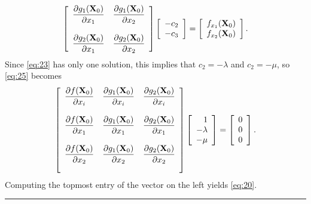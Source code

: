\documentclass{article}
\newcommand{\bbox}{\phantom{1}\hfill{\rule{6pt}{6pt}}}
\newcommand{\dst}{\displaystyle}
\begin{document}
$$
\left[\begin{array}{ccccccc}
\dst{\frac{{\partial g_{1}({\bf X}_{0})}}{{\partial  x_{1}}}}&
\dst{\frac{{\partial g_{1}({\bf X}_{0})}}{{\partial  x_{2}}}}\\\\
\dst{\frac{{\partial g_{2}({\bf X}_{0})}}{{\partial  x_{1}}}}&
\dst{\frac{{\partial g_{2}({\bf X}_{0})}}{{\partial  x_{2}}}}\\
\end{array}\right]
\left[\begin{array}{ccccccc}
-c_{2}\\-c_{3}
\end{array}\right]=
\left[\begin{array}{ccccccc}
f_{x_{1}}({\bf X}_{0})\\f_{x_{2}}({\bf X}_{0})\\
\end{array}\right].
$$
Since  \eqref{eq:23}  has only one solution,
 this implies that
$c_{2}=-\lambda$ and $c_{2}=-\mu$, so \eqref{eq:25}   becomes
$$
\left[\begin{array}{ccccccc}
\dst{\frac{{\partial f({\bf X}_{0})}}{{\partial  x_{i}}}}&
\dst{\frac{{\partial g_{1}({\bf X}_{0})}}{{\partial  x_{i}}}}&
\dst{\frac{{\partial g_{2}({\bf X}_{0})}}{{\partial  x_{i}}}}\\\\
\dst{\frac{{\partial f({\bf X}_{0})}}{{\partial  x_{1}}}}&
\dst{\frac{{\partial g_{1}({\bf X}_{0})}}{{\partial  x_{1}}}}&
\dst{\frac{{\partial g_{2}({\bf X}_{0})}}{{\partial  x_{1}}}}\\\\
\dst{\frac{{\partial f({\bf X}_{0})}}{{\partial  x_{2}}}}&
\dst{\frac{{\partial g_{1}({\bf X}_{0})}}{{\partial  x_{2}}}}&
\dst{\frac{{\partial g_{2}({\bf X}_{0})}}{{\partial  x_{2}}}}\\\\
\end{array}\right]
\left[\begin{array}{rcccccc}
1\\-\lambda\\-\mu
\end{array}\right]=
\left[\begin{array}{ccccccc}
0\\0\\0
\end{array}\right].
$$
Computing the topmost entry of the vector on the left
yields \eqref{eq:20}.
\hfill\bbox
\end{document}
